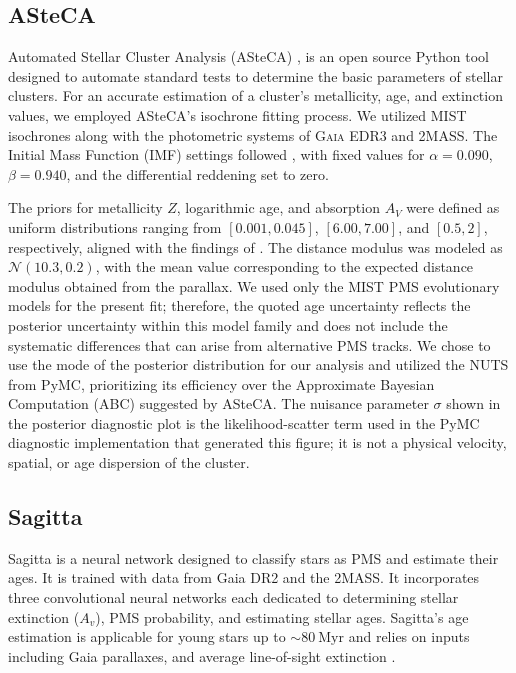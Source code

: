 \documentclass{aa}
\begin{document}
\subsection{ASteCA}
Automated Stellar Cluster Analysis (ASteCA) \citep{2015A&A...576A...6P}, is an open source Python tool designed to automate standard tests to determine the basic parameters of stellar clusters. For an accurate estimation of a cluster's metallicity, age, and extinction values, we employed ASteCA's isochrone fitting process. We utilized \textsc{MIST} isochrones \citep{2016ApJS..222....8D, 2016ApJ...823..102C} along with the photometric systems of \textsc{Gaia} EDR3 and \textsc{2MASS}. The Initial Mass Function (IMF) settings followed \citet{2014ApJ...796...75C}, with fixed values for $\alpha = 0.090$, $\beta = 0.940$, and the differential reddening set to zero.

The priors for metallicity $Z$, logarithmic age, and absorption $A_V$ were defined as uniform distributions ranging from $[0.001, 0.045]$, $[6.00, 7.00]$, and $[0.5, 2]$, respectively, aligned with the findings of \cite{2024arXiv240301030P}. The distance modulus was modeled as $\mathcal{N}(10.3, 0.2)$, with the mean value corresponding to the expected distance modulus obtained from the parallax. We used only the \textsc{MIST} PMS evolutionary models for the present fit; therefore, the quoted age uncertainty reflects the posterior uncertainty within this model family and does not include the systematic differences that can arise from alternative PMS tracks. We chose to use the mode of the posterior distribution for our analysis and utilized the NUTS from PyMC, prioritizing its efficiency over the Approximate Bayesian Computation (ABC) suggested by ASteCA. The nuisance parameter $\sigma$ shown in the posterior diagnostic plot is the likelihood-scatter term used in the PyMC diagnostic implementation that generated this figure; it is not a physical velocity, spatial, or age dispersion of the cluster.

\subsection{Sagitta}
Sagitta is a neural network designed to classify stars as PMS and estimate their ages. It is trained with data from Gaia DR2 and the 2MASS. It incorporates three convolutional neural networks each dedicated to determining stellar extinction ($A_v$), PMS probability, and estimating stellar ages. Sagitta's age estimation is applicable for young stars up to $\sim 80~\mathrm{Myr}$ and relies on inputs including Gaia parallaxes, and average line-of-sight extinction \citep{2021AJ....162..282M}.
\end{document}
